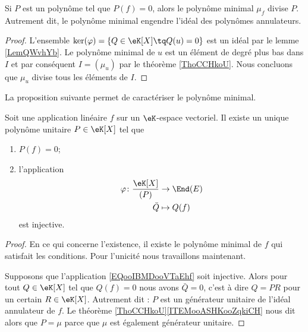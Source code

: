 \begin{proposition}     \label{PropAnnncEcCxj}
    Si \( P\) est un polynôme tel que \( P(f)=0\), alors le polynôme minimal \( \mu_f\) divise \( P\). Autrement dit, le polynôme minimal engendre l'idéal des polynômes annulateurs.
\end{proposition}

\begin{proof}
    L'ensemble \( \ker(\varphi)=\{ Q\in \eK[X]\tq Q(u)=0 \} \) est un idéal par le lemme \ref{LemQWvhYb}. Le polynôme minimal de \( u\) est un élément de degré plus bas dans \( I\) et par conséquent \( I=(\mu_u)\) par le théorème \ref{ThoCCHkoU}. Nous concluons que \( \mu_u\) divise tous les éléments de \( I\).
\end{proof}

La proposition suivante permet de caractériser le polynôme minimal.
\begin{proposition}      \label{PROPooVUJPooMzxzjE}
    Soit une application linéaire \( f\) sur un \( \eK\)-espace vectoriel. Il existe un unique polynôme unitaire \( P\in \eK[X]\) tel que
    \begin{enumerate}
        \item
            \( P(f)=0\);
        \item
            l'application
            \begin{equation}        \label{EQooIBMDooVTaEhf}
                \begin{aligned}
                    \varphi\colon \frac{ \eK[X] }{ (P) }&\to \End(E) \\
                    \bar Q&\mapsto Q(f) 
                \end{aligned}
            \end{equation}
            est injective.
    \end{enumerate}
\end{proposition}

\begin{proof}
    En ce qui concerne l'existence, il existe le polynôme minimal de \( f\) qui satisfait les conditions. Pour l'unicité nous travaillons maintenant.

    Supposons que l'application \eqref{EQooIBMDooVTaEhf} soit injective. Alors pour tout \( Q\in \eK[X]\) tel que \( Q(f)=0\) nous avons \( \bar Q=0\), c'est à dire \( Q=PR\) pour un certain \( R\in \eK[X]\). Autrement dit : \( P\) est un générateur unitaire de l'idéal annulateur de \( f\). Le théorème \ref{ThoCCHkoU}\ref{ITEMooASHKooZqkiCH} nous dit alors que \( P=\mu\) parce que \( \mu\) est également générateur unitaire.
\end{proof}

